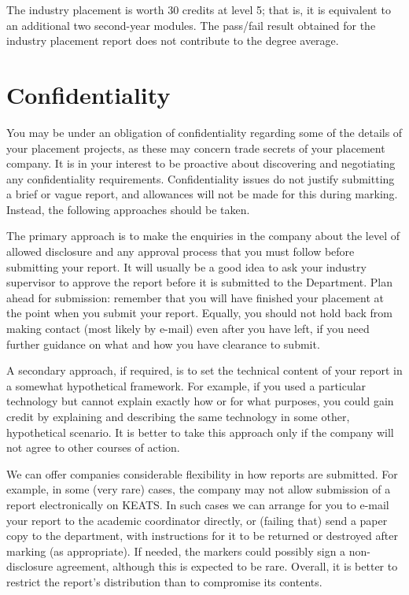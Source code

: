 \documentclass[british,12pt,a4paper]{report}
\begin{document}
The industry placement is worth 30 credits at level 5; that is,
it is equivalent to an additional two second-year modules.
The pass/fail result obtained for the industry placement report
does not contribute to the degree average.

\section{Confidentiality}
\label{sec:confidentiality}

You may be under an obligation of confidentiality
regarding some of the details of your placement projects,
as these may concern trade secrets of your placement company.
It is in your interest to be proactive about discovering
and negotiating any confidentiality requirements.
Confidentiality issues do not justify submitting a brief or vague report,
and allowances will not be made for this during marking.
Instead, the following approaches should be taken.

The primary approach is to make the enquiries in the company
about the level of allowed disclosure and any approval process that you must follow
before submitting your report.
It will usually be a good idea to ask your industry supervisor
to approve the report before it is submitted to the Department.
Plan ahead for submission: remember that
you will have finished your placement at the point when you submit your report.
Equally, you should not hold back from making contact
(most likely by e-mail) even after you have left, if you need further guidance
on what and how you have clearance to submit.

A secondary approach, if required, is to set the technical content of your report
in a somewhat hypothetical framework.
For example, if you used a particular technology but cannot explain exactly how or
for what purposes,
you could gain credit by explaining and describing the same technology in some other,
hypothetical scenario.
It is better to take this approach only if the company will not agree to other courses of action.

We can offer companies considerable flexibility in how reports are submitted.
For example, in some (very rare) cases, the company may not allow submission of a
report electronically on KEATS. In such cases we can arrange for you to e-mail your report
to the academic coordinator directly, or (failing that) send a paper copy to the department,
with instructions for it to be returned or destroyed after marking (as appropriate).
If needed, the markers could possibly sign a non-disclosure agreement,
although this is expected to be rare.
Overall, it is better to restrict the report's distribution than to compromise its contents.
\end{document}
